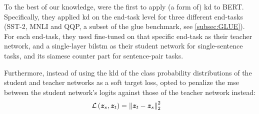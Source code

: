 To the best of our knowledge, \citet{tang2019distilling} were the first to apply (a form of) \gls{kd} to BERT. Specifically, they applied \gls{kd} on the end-task level for three different end-tasks (SST-2, MNLI and QQP, a subset of the \gls{glue} benchmark, see \cref{subsec:GLUE}). For each end-task, they used \bertlarge fine-tuned on that specific end-task as their teacher network, and a single-layer \gls{bilstm} \citep{hochreiter1997long} as their student network for single-sentence tasks, 
and its siamese counter part for sentence-pair tasks.


Furthermore, instead of using the \gls{kld} of the class probability distributions of the student and teacher networks as a soft target loss, \citet{tang2019distilling} opted to penalize the \gls{mse} between the student network's logits against those of the teacher network instead:
\begin{align}
    \label{eq:mse_loss}
    \loss{\vect{z}_s, \vect{z}_t} &= \norm{\vect{z}_t - \vect{z}_s}_2^2
\end{align}




